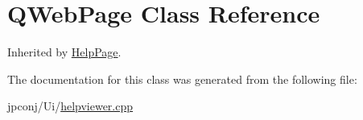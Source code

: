 \hypertarget{class_q_web_page}{}\section{Q\+Web\+Page Class Reference}
\label{class_q_web_page}


Inherited by \hyperlink{class_help_page}{Help\+Page}.



The documentation for this class was generated from the following file\+:\begin{DoxyCompactItemize}
\item 
jpconj/\+Ui/\hyperlink{helpviewer_8cpp}{helpviewer.\+cpp}\end{DoxyCompactItemize}
